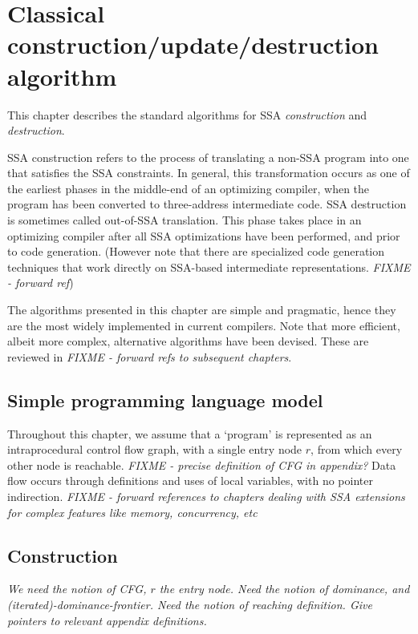 \chapter{Classical construction/update/destruction algorithm }

\def\phiops{$\phi$-functions}
\def\phiop{$\phi$-function}


This chapter describes the standard algorithms for SSA \textit{construction} and
\textit{destruction}.

SSA construction refers to the process of translating a non-SSA program into
one that satisfies the SSA constraints. In general, this transformation
occurs as one of the
earliest phases in the middle-end of an optimizing compiler, when the program
has been converted to three-address intermediate code.
SSA destruction is sometimes called out-of-SSA translation. This phase
takes place in an optimizing compiler after all SSA optimizations have
been performed, and prior to code generation. (However note that there are
specialized code generation techniques that work directly on SSA-based
intermediate representations. \emph{FIXME - forward ref})

The algorithms presented in this chapter are simple and pragmatic, hence they
are the most widely implemented in current compilers. Note that more
efficient, albeit more complex, alternative algorithms have been devised.
These are reviewed in \emph{FIXME - forward refs to subsequent chapters}.

\section{Simple programming language model}

Throughout this chapter,
we assume that a `program' is represented as an
intraprocedural control flow graph,
with a single entry node $r$, from which every other
node is reachable.
\emph{FIXME - precise definition of CFG in appendix?}
Data flow occurs through definitions and uses of 
local variables, with no pointer indirection.
\emph{FIXME - forward references to chapters dealing with
SSA extensions for complex features like memory, concurrency, etc}



\section{Construction}
{\em We need the notion of CFG, $r$ the entry node. Need the notion of
  dominance, and (iterated)-dominance-frontier. Need the notion of reaching
  definition. Give pointers to relevant appendix definitions.}



